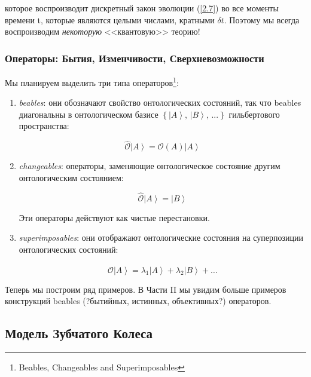 \documentclass[main.tex]{subfiles}
\begin{document}
которое воспроизводит дискретный закон эволюции (\ref{2.7}) во все моменты времени t, которые являются целыми числами, кратными $\delta t$. Поэтому мы всегда воспроизводим \textit{некоторую} <<квантовую>> теорию!

\subsubsection{Операторы: Бытия, Изменчивости, Сверхневозможности}\label{ch2.1.1}

Мы планируем выделить три типа операторов\footnote{Beables, Changeables and Superimposables}:

\begin{enumerate}
	\item \textit{beables}: они обозначают свойство онтологических состояний, так что beables диагональны в онтологическом базисе $\left\{ \left|A\right>,\,\left|B\right>,\,... \right\}$ гильбертового пространства:

	\begin{equation}\label{2.10}
		\hat{\mathcal{O}} \left|A\right> = \mathcal{O}(A) \left|A\right>
	\end{equation}

	\item \textit{changeables}: операторы, заменяющие онтологическое состояние другим онтологическим состоянием:

	\begin{equation}\label{2.11}
		\hat{\mathcal{O}} \left|A\right> = \left|B\right>
	\end{equation}

	Эти операторы действуют как чистые перестановки.
	\item \textit{superimposables}: они отображают онтологические состояния на суперпозиции онтологических состояний:

	\begin{equation}\label{2.12}
		\hat{\mathcal{O}} \left|A\right> = \lambda_1\left|A\right> + \lambda_2\left|B\right> + \ldots
	\end{equation}

\end{enumerate}

Теперь мы построим ряд примеров. В Части II мы увидим больше примеров конструкций beables (?бытийных, истинных, объективных?) операторов.


\subsection{Модель Зубчатого Колеса}\label{ch2.2}
\end{document}
